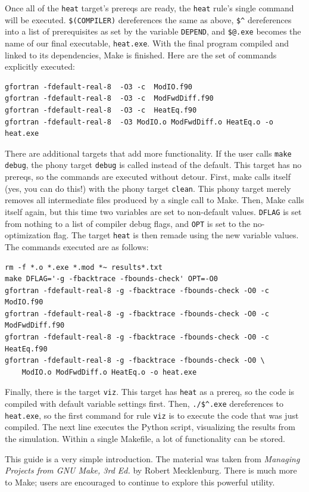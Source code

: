\documentclass[12pt, letterpaper]{article}
\begin{document}
Once all of the {\tt heat} target's prereqs are ready, the {\tt heat} rule's
single command will be executed.  \verb|$(COMPILER)| dereferences the same
as above, \verb|$^| dereferences into a list of prerequisites as set by the
variable {\tt DEPEND}, and \verb|$@.exe| becomes the name of our final
executable, {\tt heat.exe}.  With the final program compiled and linked to
its dependencies, Make is finished.  Here are the
 set of commands explicitly executed:
\begin{verbatim}
gfortran -fdefault-real-8  -O3 -c  ModIO.f90
gfortran -fdefault-real-8  -O3 -c  ModFwdDiff.f90
gfortran -fdefault-real-8  -O3 -c  HeatEq.f90
gfortran -fdefault-real-8  -O3 ModIO.o ModFwdDiff.o HeatEq.o -o heat.exe
\end{verbatim}

There are additional targets that add more functionality.  If the user
calls {\tt make debug}, the phony target {\tt debug} is called instead of
the default.  This target has no prereqs, so the commands are executed without
detour.  First, make calls itself (yes, you can do this!) with the phony
target {\tt clean}.  This phony target merely removes all intermediate files
produced by a single call to Make.  Then, Make calls itself again, but this time
two variables are set to non-default values.  {\tt DFLAG} is set from nothing
to a list of compiler debug flags, and {\tt OPT} is set to the no-optimization
flag.  The target {\tt heat} is then remade using the new variable values.  
The commands executed are as follows:

\begin{verbatim}
rm -f *.o *.exe *.mod *~ results*.txt
make DFLAG='-g -fbacktrace -fbounds-check' OPT=-O0
gfortran -fdefault-real-8 -g -fbacktrace -fbounds-check -O0 -c  ModIO.f90
gfortran -fdefault-real-8 -g -fbacktrace -fbounds-check -O0 -c  ModFwdDiff.f90
gfortran -fdefault-real-8 -g -fbacktrace -fbounds-check -O0 -c  HeatEq.f90
gfortran -fdefault-real-8 -g -fbacktrace -fbounds-check -O0 \
    ModIO.o ModFwdDiff.o HeatEq.o -o heat.exe 
\end{verbatim}

Finally, there is the target {\tt viz}.  This target has {\tt heat} as a 
prereq, so the code is compiled with default variable settings first.  Then,
\verb|./$^.exe| dereferences to {\tt heat.exe}, so the first command for
rule {\tt viz} is to
execute the code that was just compiled.  The next line executes the Python
script, visualizing the results from the simulation.  Within
a single Makefile, a lot of functionality can be stored.

This guide is a very simple introduction.  The material was taken from 
\emph{Managing Projects from GNU Make, 3rd Ed.} by Robert Mecklenburg.  There
is much more to Make; users are encouraged to continue to explore this 
powerful utility.
\end{document}
